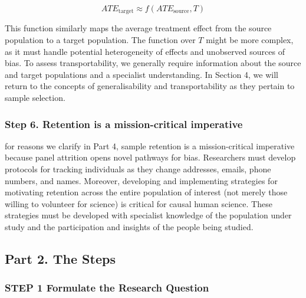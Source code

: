 \documentclass[
  singlecolumn]{article}
\begin{document}
\[ATE_{\text{target}} \approx f(ATE_{\text{source}}, T)\]

This function similarly maps the average treatment effect from the
source population to a target population. The function over \(T\) might
be more complex, as it must handle potential heterogeneity of effects
and unobserved sources of bias. To assess transportability, we generally
require information about the source and target populations and a
specialist understanding. In Section 4, we will return to the concepts
of generalisability and transportability as they pertain to sample
selection.

\hypertarget{step-6.-retention-is-a-mission-critical-imperative}{%
\subsubsection{Step 6. Retention is a mission-critical
imperative}\label{step-6.-retention-is-a-mission-critical-imperative}}

for reasons we clarify in Part 4, sample retention is a mission-critical
imperative because panel attrition opens novel pathways for bias.
Researchers must develop protocols for tracking individuals as they
change addresses, emails, phone numbers, and names. Moreover, developing
and implementing strategies for motivating retention across the entire
population of interest (not merely those willing to volunteer for
science) is critical for causal human science. These strategies must be
developed with specialist knowledge of the population under study and
the participation and insights of the people being studied.

\hypertarget{part-2.-the-steps}{%
\subsection{Part 2. The Steps}\label{part-2.-the-steps}}

\hypertarget{step-1-formulate-the-research-question}{%
\subsubsection{STEP 1 Formulate the Research
Question}\label{step-1-formulate-the-research-question}}
\end{document}
